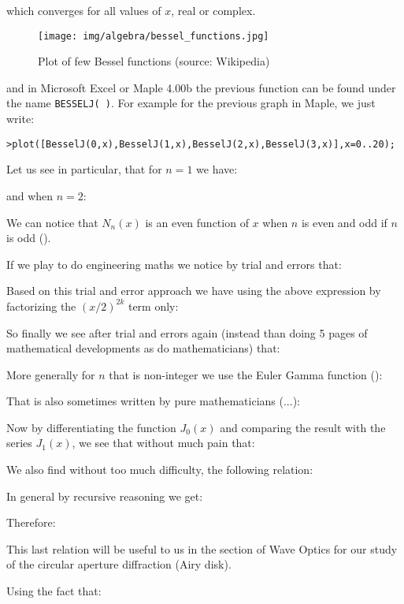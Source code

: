 	which converges for all values of $x$, real or complex.
	\begin{figure}[H]
		\centering
		\texttt{[image: img/algebra/bessel\_functions.jpg]}
		\caption[Plot of few Bessel functions]{Plot of few Bessel functions (source: Wikipedia)}
	\end{figure}
	and in Microsoft Excel or Maple 4.00b the previous function can be found under the name \texttt{BESSELJ( )}. For example for the previous graph in Maple, we just write:
	
	\texttt{>plot([BesselJ(0,x),BesselJ(1,x),BesselJ(2,x),BesselJ(3,x)],x=0..20);}
	
	Let us see in particular, that for $n=1$ we have:
	
	and when $n=2$:
	
	We can notice that $N_n(x)$ is an even function of $x$ when $n$ is even and odd if $n$ is odd ().
	
	If we play to do engineering maths we notice by trial and errors that:
	
	Based on this trial and error approach we have using the above expression by factorizing the $(x/2)^{2k}$ term only:
	
	So finally we see after trial and errors again (instead than doing 5 pages of mathematical developments as do mathematicians) that\label{condensed expression of Bessel series}:
	
	More generally for $n$ that is non-integer we use the Euler Gamma function ():
	
	That is also sometimes written by pure mathematicians (...):
	
	Now by differentiating the function $J_0(x)$ and comparing the result with the series $J_1(x)$, we see that without much pain that:
	
	We also find without too much difficulty, the following relation\label{bessel differential reccurence relation}:
	 
	\begin{tcolorbox}[title=Remark,colframe=black,arc=10pt]
	In general by recursive reasoning we get:
	
	Therefore:
	
	This last relation will be useful to us in the section of Wave Optics for our study of the circular aperture diffraction (Airy disk).
	\end{tcolorbox}
	Using the fact that:
	
